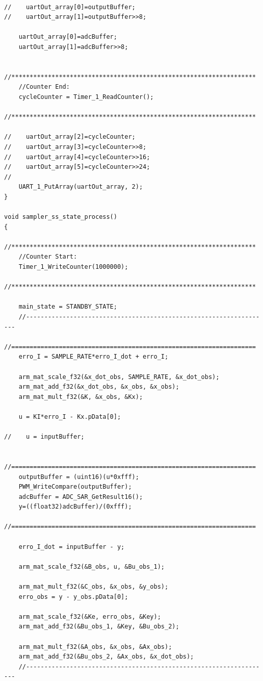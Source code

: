 \documentclass[
	article,			%
	11pt,				%
	oneside,			%
	a4paper,			%
	english,			%
	brazil,				%
	sumario=tradicional
	]{abntex2}
\begin{document}
\begin{apendicesenv}
\begin{lstlisting}
    
//    uartOut_array[0]=outputBuffer;
//    uartOut_array[1]=outputBuffer>>8;

    uartOut_array[0]=adcBuffer;
    uartOut_array[1]=adcBuffer>>8;
    
    //*******************************************************************
    //Counter End:
    cycleCounter = Timer_1_ReadCounter(); 
    //*******************************************************************   
    
//    uartOut_array[2]=cycleCounter;
//    uartOut_array[3]=cycleCounter>>8;
//    uartOut_array[4]=cycleCounter>>16;
//    uartOut_array[5]=cycleCounter>>24;
//    
    UART_1_PutArray(uartOut_array, 2);  
}

void sampler_ss_state_process()
{
    //*******************************************************************
    //Counter Start:
    Timer_1_WriteCounter(1000000);
    //*******************************************************************
    
    main_state = STANDBY_STATE;      
    //-------------------------------------------------------------------
    //===================================================================          
    erro_I = SAMPLE_RATE*erro_I_dot + erro_I;
    
    arm_mat_scale_f32(&x_dot_obs, SAMPLE_RATE, &x_dot_obs);
    arm_mat_add_f32(&x_dot_obs, &x_obs, &x_obs);
    arm_mat_mult_f32(&K, &x_obs, &Kx);
       
    u = KI*erro_I - Kx.pData[0];     
    
//    u = inputBuffer;
    
    //===================================================================  
    outputBuffer = (uint16)(u*0xfff);   
    PWM_WriteCompare(outputBuffer);        
    adcBuffer = ADC_SAR_GetResult16(); 
    y=((float32)adcBuffer)/(0xfff);   
    //===================================================================  
    
    erro_I_dot = inputBuffer - y;
    
    arm_mat_scale_f32(&B_obs, u, &Bu_obs_1);
    
    arm_mat_mult_f32(&C_obs, &x_obs, &y_obs);
    erro_obs = y - y_obs.pData[0];
    
    arm_mat_scale_f32(&Ke, erro_obs, &Key);
    arm_mat_add_f32(&Bu_obs_1, &Key, &Bu_obs_2);
    
    arm_mat_mult_f32(&A_obs, &x_obs, &Ax_obs);
    arm_mat_add_f32(&Bu_obs_2, &Ax_obs, &x_dot_obs);    
    //-------------------------------------------------------------------


\end{lstlisting}
\end{apendicesenv}
\end{document}
